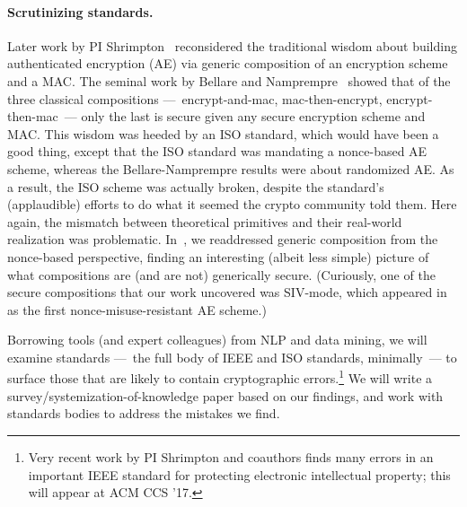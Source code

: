 \paragraph{Scrutinizing standards. }
Later work by PI Shrimpton~\cite{NRS} reconsidered the traditional wisdom about
building authenticated encryption (AE) via generic composition of an encryption
scheme and a MAC.   The seminal work by Bellare and Namprempre~\cite{BN} showed
that of the three classical compositions ---~encrypt-and-mac, mac-then-encrypt,
encrypt-then-mac~--- only the last is secure given any secure encryption scheme
and MAC.   This wisdom was heeded by an ISO standard, which would have been a
good thing, except that the ISO standard was mandating a nonce-based AE scheme,
whereas the Bellare-Namprempre results were about randomized AE.  As a result,
the ISO scheme was actually broken, despite the standard's (applaudible) efforts
to do what it seemed the crypto community told them.  Here again, the mismatch
between theoretical primitives and their real-world realization was problematic.
In~\cite{NRS}, we readdressed generic composition from the nonce-based
perspective, finding an interesting (albeit less simple) picture of what
compositions are (and are not) generically secure.  (Curiously, one of the
secure compositions that our work uncovered was SIV-mode, which
appeared in~\cite{RS06} as the first nonce-misuse-resistant AE scheme.)

\begin{task}
Borrowing tools (and expert colleagues) from NLP and data mining, we
will examine standards ---~the full body of IEEE and ISO standards,
minimally~--- to surface those that are likely to contain cryptographic
errors.\footnote{Very recent work by PI Shrimpton and coauthors finds many
errors in an important IEEE standard for protecting electronic
intellectual property; this will appear at ACM CCS '17.}  We will
write a survey/systemization-of-knowledge paper based on our findings, and work with standards
bodies to address the mistakes we find.  
\end{task}



